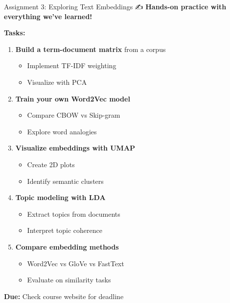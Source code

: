 \documentclass[aspectratio=169]{beamer}
\begin{document}
\begin{frame}[shrink=10]{Assignment 3: Exploring Text Embeddings ✍️}
\textbf{Hands-on practice with everything we've learned!}

\vspace{1em}

\textbf{Tasks:}
\begin{enumerate}\setlength{\itemsep}{0pt}
    \item \textbf{Build a term-document matrix} from a corpus
    \begin{itemize}\setlength{\itemsep}{0pt}
        \item Implement TF-IDF weighting
        \item Visualize with PCA
    \end{itemize}

    \item \textbf{Train your own Word2Vec model}
    \begin{itemize}\setlength{\itemsep}{0pt}
        \item Compare CBOW vs Skip-gram
        \item Explore word analogies
    \end{itemize}

    \item \textbf{Visualize embeddings with UMAP}
    \begin{itemize}\setlength{\itemsep}{0pt}
        \item Create 2D plots
        \item Identify semantic clusters
    \end{itemize}

    \item \textbf{Topic modeling with LDA}
    \begin{itemize}\setlength{\itemsep}{0pt}
        \item Extract topics from documents
        \item Interpret topic coherence
    \end{itemize}

    \item \textbf{Compare embedding methods}
    \begin{itemize}\setlength{\itemsep}{0pt}
        \item Word2Vec vs GloVe vs FastText
        \item Evaluate on similarity tasks
    \end{itemize}
\end{enumerate}

\vspace{0.5em}
\textbf{Due:} Check course website for deadline
\end{frame}
\end{document}
